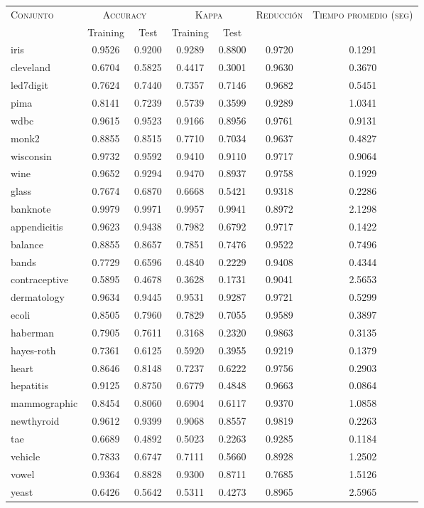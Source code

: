 \begin{table}[]
\centering
\begin{tabular}{l c c c c c c}
\hline
\multirow{2}{*}{\textsc{Conjunto}}
	& \multicolumn{2}{c}{\textsc{Accuracy}}
	& \multicolumn{2}{c}{\textsc{Kappa}}
	& \textsc{Reducción}
	& \textsc{Tiempo promedio (seg)} \\
	& Training & Test
	& Training & Test \\ 
\hline
\hline

iris & 0.9526 & 0.9200 & 0.9289 & 0.8800 & 0.9720 & 0.1291 \\
cleveland & 0.6704 & 0.5825 & 0.4417 & 0.3001 & 0.9630 & 0.3670 \\
led7digit & 0.7624 & 0.7440 & 0.7357 & 0.7146 & 0.9682 & 0.5451 \\
pima & 0.8141 & 0.7239 & 0.5739 & 0.3599 & 0.9289 & 1.0341 \\
wdbc & 0.9615 & 0.9523 & 0.9166 & 0.8956 & 0.9761 & 0.9131 \\
monk2 & 0.8855 & 0.8515 & 0.7710 & 0.7034 & 0.9637 & 0.4827 \\
wisconsin & 0.9732 & 0.9592 & 0.9410 & 0.9110 & 0.9717 & 0.9064 \\
wine & 0.9652 & 0.9294 & 0.9470 & 0.8937 & 0.9758 & 0.1929 \\
glass & 0.7674 & 0.6870 & 0.6668 & 0.5421 & 0.9318 & 0.2286 \\
banknote & 0.9979 & 0.9971 & 0.9957 & 0.9941 & 0.8972 & 2.1298 \\
appendicitis & 0.9623 & 0.9438 & 0.7982 & 0.6792 & 0.9717 & 0.1422 \\
balance & 0.8855 & 0.8657 & 0.7851 & 0.7476 & 0.9522 & 0.7496 \\
bands & 0.7729 & 0.6596 & 0.4840 & 0.2229 & 0.9408 & 0.4344 \\
contraceptive & 0.5895 & 0.4678 & 0.3628 & 0.1731 & 0.9041 & 2.5653 \\
dermatology & 0.9634 & 0.9445 & 0.9531 & 0.9287 & 0.9721 & 0.5299 \\
ecoli & 0.8505 & 0.7960 & 0.7829 & 0.7055 & 0.9589 & 0.3897 \\
haberman & 0.7905 & 0.7611 & 0.3168 & 0.2320 & 0.9863 & 0.3135 \\
hayes-roth & 0.7361 & 0.6125 & 0.5920 & 0.3955 & 0.9219 & 0.1379 \\
heart & 0.8646 & 0.8148 & 0.7237 & 0.6222 & 0.9756 & 0.2903 \\
hepatitis & 0.9125 & 0.8750 & 0.6779 & 0.4848 & 0.9663 & 0.0864 \\
mammographic & 0.8454 & 0.8060 & 0.6904 & 0.6117 & 0.9370 & 1.0858 \\
newthyroid & 0.9612 & 0.9399 & 0.9068 & 0.8557 & 0.9819 & 0.2263 \\
tae & 0.6689 & 0.4892 & 0.5023 & 0.2263 & 0.9285 & 0.1184 \\
vehicle & 0.7833 & 0.6747 & 0.7111 & 0.5660 & 0.8928 & 1.2502 \\
vowel & 0.9364 & 0.8828 & 0.9300 & 0.8711 & 0.7685 & 1.5126 \\
yeast & 0.6426 & 0.5642 & 0.5311 & 0.4273 & 0.8965 & 2.5965 \\


\end{tabular}
\end{table}
